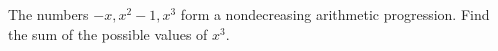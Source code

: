 The numbers $-x,x^2-1,x^3$ form a nondecreasing arithmetic progression. Find the sum of the possible values of $x^3$.
